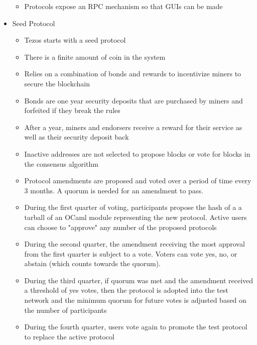 \documentclass[a4paper]{article}
\begin{document}
\begin{itemize}
\begin{itemize}
\item Protocols expose an RPC mechanism so that GUIs can be made
\end{itemize}

\item Seed Protocol
\begin{itemize}
\item Tezos starts with a seed protocol
\item There is a finite amount of coin in the system
\item Relies on a combination of bonds and rewards to incentivize miners to secure the blockchain
\item Bonds are one year security deposits that are purchased by miners and forfeited if they break the rules
\item After a year, miners and endorsers receive a reward for their service as well as their security deposit back
\item Inactive addresses are not selected to propose blocks or vote for blocks in the consensus algorithm
\item Protocol amendments are proposed and voted over a period of time every 3 months. A quorum is needed for an amendment to pass.
\item During the first quarter of voting, participants propose the hash of a a tarball of an OCaml module representing the new protocol. Active users can choose to "approve" any number of the proposed protocols
\item During the second quarter, the amendment receiving the most approval from the first quarter is subject to a vote. Voters can vote yes, no, or abstain (which counts towards the quorum).
\item During the third quarter, if quorum was met and the amendment received a threshold of yes votes, then the protocol is adopted into the test network and the minimum quorum for future votes is adjusted based on the number of participants
\item During the fourth quarter, users vote again to promote the test protocol to replace the active protocol


\end{itemize}
\end{itemize}
\end{document}
